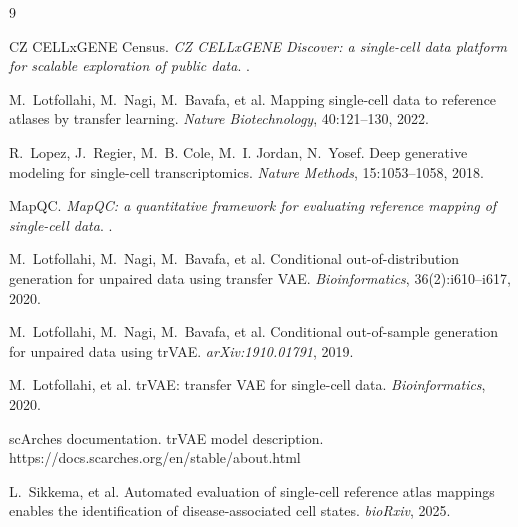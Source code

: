 \documentclass[12pt, a4paper]{article}
\begin{document}
\begin{thebibliography}{9}

CZ CELLxGENE Census.
\newblock \emph{CZ CELLxGENE Discover: a single-cell data platform for
scalable exploration of public data}.
.

M.~Lotfollahi, M.~Nagi, M.~Bavafa, et al.
\newblock Mapping single-cell data to reference atlases by transfer
learning.
\newblock \emph{Nature Biotechnology}, 40:121--130, 2022.

R.~Lopez, J.~Regier, M.~B. Cole, M.~I. Jordan, N.~Yosef.
\newblock Deep generative modeling for single-cell transcriptomics.
\newblock \emph{Nature Methods}, 15:1053--1058, 2018.

MapQC.
\newblock \emph{MapQC: a quantitative framework for evaluating reference
mapping of single-cell data}.
.

M.~Lotfollahi, M.~Nagi, M.~Bavafa, et al.
\newblock Conditional out-of-distribution generation for unpaired data using transfer VAE.
\newblock \emph{Bioinformatics}, 36(2):i610--i617, 2020.

M.~Lotfollahi, M.~Nagi, M.~Bavafa, et al.
\newblock Conditional out-of-sample generation for unpaired data using trVAE.
\newblock \emph{arXiv:1910.01791}, 2019.

M.~Lotfollahi, et al.
\newblock trVAE: transfer VAE for single-cell data.
\newblock \emph{Bioinformatics}, 2020.

scArches documentation.
\newblock trVAE model description.
\newblock https://docs.scarches.org/en/stable/about.html

L.~Sikkema, et al.
\newblock Automated evaluation of single-cell reference atlas mappings enables the identification of disease-associated cell states.
\newblock \emph{bioRxiv}, 2025.

\end{thebibliography}
\end{document}
